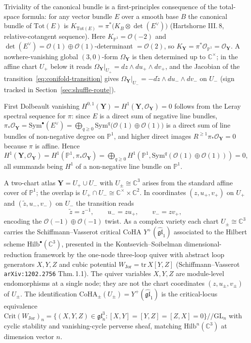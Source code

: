 \documentclass[11pt]{amsart}
\theoremstyle{definition}
\providecommand{\CoHA}{\mathrm{CoHA}}
\providecommand{\bY}{\mathbf{Y}}
\providecommand{\cO}{\mathcal{O}}
\providecommand{\bC}{\mathbb{C}}
\providecommand{\bP}{\mathbb{P}}
\providecommand{\fgl}{\mathfrak{gl}}
\begin{document}
Triviality of the canonical bundle is a first-principles consequence of the
total-space formula: for any vector bundle $E$ over a smooth base $B$ the
canonical bundle of $\mathrm{Tot}(E)$ is
$K_{\mathrm{Tot}(E)} = \pi^*\bigl(K_B \otimes \det(E^\vee)\bigr)$
(Hartshorne III.\,8, relative-cotangent sequence). Here
$K_{\bP^1} = \cO(-2)$ and $\det(E^\vee) = \cO(1) \oplus \cO(1)$-determinant
$= \cO(2)$, so $K_{\bY} = \pi^*\cO_{\bP^1} = \cO_{\bY}$. A nowhere-vanishing
global $(3,0)$-form $\Omega_{\bY}$ is then determined up to $\bC^\times$; in
the affine chart $U_+$ below it reads $\Omega_{\bY}|_{U_+} = dz \wedge du_+
\wedge dv_+$, and the Jacobian of the transition~\eqref{eq:conifold-transition}
gives $\Omega_{\bY}|_{U_-} = -d\tilde z \wedge du_- \wedge dv_-$ on $U_-$
(sign tracked in Section~\ref{sec:shuffle-route}).

First Dolbeault vanishing $H^{0,1}(\bY) = H^1(\bY, \cO_{\bY}) = 0$ follows from
the Leray spectral sequence for $\pi$: since $E$ is a direct sum of negative
line bundles, $\pi_* \cO_{\bY} = \mathrm{Sym}^\bullet(E^\vee) =
\bigoplus_{q \geq 0} \mathrm{Sym}^q\bigl(\cO(1) \oplus \cO(1)\bigr)$ is a
direct sum of line bundles of non-negative degree on $\bP^1$, and higher
direct images $R^{\geq 1} \pi_* \cO_{\bY} = 0$ because $\pi$ is affine.
Hence $H^1(\bY, \cO_{\bY}) = H^1(\bP^1, \pi_* \cO_{\bY}) = \bigoplus_{q \geq 0}
H^1(\bP^1, \mathrm{Sym}^q(\cO(1) \oplus \cO(1))) = 0$, all summands being
$H^1$ of a non-negative line bundle on $\bP^1$.

A two-chart atlas $\bY = U_+ \cup U_-$ with $U_\pm \cong \bC^3$ arises from
the standard affine cover of $\bP^1$; the overlap is $U_+ \cap U_- \cong
\bC^\times \times \bC^2$. In coordinates $(z, u_+, v_+)$ on $U_+$ and $(\tilde
z, u_-, v_-)$ on $U_-$ the transition reads
\begin{equation}\label{eq:conifold-transition}
  \tilde z = z^{-1}, \qquad u_- = z u_+, \qquad v_- = z v_+,
\end{equation}
encoding the $\cO(-1) \oplus \cO(-1)$ twist. As a complex variety each chart
$U_\pm \cong \bC^3$ carries the Schiffmann--Vasserot critical CoHA
$Y^+(\widehat{\fgl}_1)$ associated to the Hilbert scheme
$\mathrm{Hilb}^\bullet(\bC^3)$, presented in the Kontsevich--Soibelman
dimensional-reduction framework by the one-node three-loop quiver with
abstract loop generators $X, Y, Z$ and cubic potential
$W_{\mathrm{Jor}} = \mathrm{tr}\,X[Y,Z]$
(Schiffmann--Vasserot \texttt{arXiv:1202.2756} Thm.\,1.1). The quiver
variables $X, Y, Z$ are module-level endomorphisms at a single node; they are
not the chart coordinates $(z, u_\pm, v_\pm)$ of $U_\pm$. The identification
$\CoHA_\pm(U_\pm) = Y^+(\widehat{\fgl}_1)$ is the critical-locus equivalence
$\mathrm{Crit}(W_{\mathrm{Jor}})_n = \{(X,Y,Z) \in \fgl_n^3 :
[X,Y] = [Y,Z] = [Z,X] = 0\} /\!\!/ \mathrm{GL}_n$
with cyclic stability and vanishing-cycle perverse sheaf, matching
$\mathrm{Hilb}^n(\bC^3)$ at dimension vector $n$.
\end{document}
